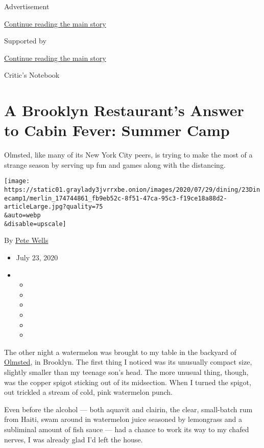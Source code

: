 Advertisement

\protect\hyperlink{after-top}{Continue reading the main story}

Supported by

\protect\hyperlink{after-sponsor}{Continue reading the main story}

Critic's Notebook

\hypertarget{a-brooklyn-restaurants-answer-to-cabin-fever-summer-camp}{%
\section{A Brooklyn Restaurant's Answer to Cabin Fever: Summer
Camp}\label{a-brooklyn-restaurants-answer-to-cabin-fever-summer-camp}}

Olmsted, like many of its New York City peers, is trying to make the
most of a strange season by serving up fun and games along with the
distancing.

\texttt{[image: https://static01.graylady3jvrrxbe.onion/images/2020/07/29/dining/23Dinecamp1/merlin\_174744861\_fb9eb52c-8f51-47ca-95c3-f19ce18a88d2-articleLarge.jpg?quality=75\\\&auto=webp\\\&disable=upscale]}

By \href{https://www.nytimes3xbfgragh.onion/by/pete-wells}{Pete Wells}

\begin{itemize}
\item
  July 23, 2020
\item
  \begin{itemize}
  \item
  \item
  \item
  \item
  \item
  \item
  \end{itemize}
\end{itemize}

The other night a watermelon was brought to my table in the backyard of
\href{https://www.nytimes3xbfgragh.onion/2016/08/10/dining/olmsted-restaurant-review.html}{Olmsted},
in Brooklyn. The first thing I noticed was its unusually compact size,
slightly smaller than my teenage son's head. The more unusual thing,
though, was the copper spigot sticking out of its midsection. When I
turned the spigot, out trickled a stream of cold, pink watermelon punch.

Even before the alcohol --- both aquavit and clairin, the clear,
small-batch rum from Haiti, swam around in watermelon juice seasoned by
lemongrass and a subliminal amount of fish sauce --- had a chance to
work its way to my chafed nerves, I was already glad I'd left the house.


